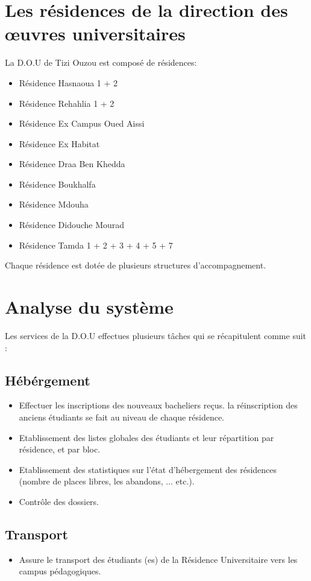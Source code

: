 \section{Les résidences de la direction des œuvres universitaires}
    La D.O.U de Tizi Ouzou est composé de résidences:
    \begin{itemize}
        \item Résidence Hasnaoua 1 + 2
        \item Résidence Rehahlia 1 + 2
        \item Résidence Ex Campus Oued Aissi
        \item Résidence Ex Habitat
        \item Résidence Draa Ben Khedda
        \item Résidence Boukhalfa
        \item Résidence Mdouha
        \item Résidence Didouche Mourad
        \item Résidence Tamda 1 + 2 + 3 + 4 + 5 + 7
    \end{itemize}
    Chaque résidence est dotée de plusieurs structures d’accompagnement.

\section{Analyse du système}
    Les services de la D.O.U effectues plusieurs tâches qui se récapitulent comme suit :

    \subsection*{Hébérgement}
    \begin{itemize}
        \item Effectuer les inscriptions des nouveaux bacheliers reçus. la réinscription des anciens étudiants se fait au niveau de chaque résidence.
        \item Etablissement des listes globales des étudiants et leur répartition par résidence, et par bloc.
        \item Etablissement des statistiques sur l'état d'hébergement des résidences (nombre de places libres, les abandons, ... etc.).
        \item Contrôle des dossiers.
    \end{itemize}

    \subsection*{Transport}
    \begin{itemize}
        \item Assure le transport des étudiants (es) de la Résidence Universitaire vers les campus pédagogiques.
    \end{itemize}

